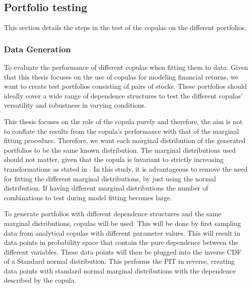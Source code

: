 \subsection{Portfolio testing}\label{sec:PortfolioTesting}
This section details the steps in the test of the copulas on the different portfolios. 

\subsubsection{Data Generation}
To evaluate the performance of different copulas when fitting them to data. Given that this thesis focuses on the use of copulas for modeling financial returns, we want to create test portfolios consisting of pairs of stocks. These portfolios should ideally cover a wide range of dependence structures to test the different copulas' versatility and robustness in varying conditions. 

This thesis focuses on the role of the copula purely and therefore, the aim is not to conflate the results from the copula's performance with that of the marginal fitting procedure. Therefore, we want each marginal distribution of the generated portfolios to be the same known distribution. The marginal distributions used should not matter, given that the copula is invariant to strictly increasing transformations as stated in . In this study, it is advantageous to remove the need for fitting the different marginal distributions, by just using the normal distribution. If having different marginal distributions the number of combinations to test during model fitting becomes large.  

To generate portfolios with different dependence structures and the same marginal distributions, copulas will be used. This will be done by first sampling data from analytical copulas with different parameter values. This will result in data points in probability space that contain the pure dependence between the different variables. These data points will then be plugged into the inverse \gls{CDF} of a Standard normal distribution. This performs the \gls{PIT} in reverse, creating data points with standard normal marginal distributions with the dependence described by the copula. 

